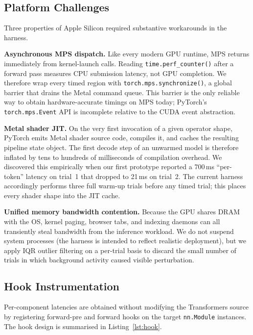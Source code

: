 \documentclass[conference]{IEEEtran}
\begin{document}
\subsection{Platform Challenges}

Three properties of Apple Silicon required substantive workarounds in
the harness.

\textbf{Asynchronous MPS dispatch.} Like every modern GPU runtime, MPS
returns immediately from kernel-launch calls. Reading
\texttt{time.perf\_counter()} after a forward pass measures CPU
submission latency, not GPU completion. We therefore wrap every timed
region with \texttt{torch.mps.synchronize()}, a global barrier that
drains the Metal command queue. This barrier is the only reliable way
to obtain hardware-accurate timings on MPS today; PyTorch's
\texttt{torch.mps.Event} API is incomplete relative to the CUDA event
abstraction.

\textbf{Metal shader JIT.} On the very first invocation of a given
operator shape, PyTorch emits Metal shader source code, compiles it,
and caches the resulting pipeline state object. The first decode step
of an unwarmed model is therefore inflated by tens to hundreds of
milliseconds of compilation overhead. We discovered this empirically
when our first prototype reported a 700\,ms ``per-token'' latency on
trial~1 that dropped to 21\,ms on trial~2. The current harness
accordingly performs three full warm-up trials before any timed trial;
this places every shader shape into the JIT cache.

\textbf{Unified memory bandwidth contention.} Because the GPU shares
DRAM with the OS, kernel paging, browser tabs, and indexing daemons can
all transiently steal bandwidth from the inference workload. We do not
suspend system processes (the harness is intended to reflect realistic
deployment), but we apply IQR outlier filtering on a per-trial basis to
discard the small number of trials in which background activity caused
visible perturbation.

\subsection{Hook Instrumentation}

Per-component latencies are obtained without modifying the
Transformers source by registering forward-pre and forward hooks on the
target \texttt{nn.Module} instances. The hook design is summarised in
Listing~\ref{lst:hook}.
\end{document}
